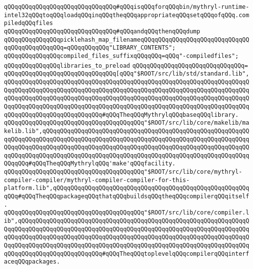 \verb|qQQqqQQqqQQqqQQqqQQqqQQqqQQqqQQq#qQQqisqQQqforqQQqbin/mythryl-runtime-intel32qQQqtoqQQqloadqQQqinqQQqtheqQQqappropriateqQQqsetqQQqofqQQq.compiledqQQqfiles|\newline
\verb|qQQqqQQqqQQqqQQqqQQqqQQqqQQqqQQq#qQQqandqQQqthenqQQqdump|\newline
\newline
\verb|qQQqqQQqqQQqqQQqpicklehash_map_filenameqQQqqQQqqQQqqQQqqQQqqQQqqQQqqQQqqQQqqQQqqQQqqQQq=qQQqqQQqqQQq"LIBRARY_CONTENTS";|\newline
\newline
\verb|qQQqqQQqqQQqqQQqcompiled_files_suffixqQQqqQQq=qQQq"-compiledfiles";|\newline
\newline
\verb|qQQqqQQqqQQqqQQqlibraries_to_preload|\newline
\verb|qQQqqQQqqQQqqQQqqQQqqQQqqQQqqQQq=|\newline
\verb|qQQqqQQqqQQqqQQqqQQqqQQqqQQqqQQq[qQQq"$ROOT/src/lib/std/standard.lib",qQQqqQQqqQQqqQQqqQQqqQQqqQQqqQQqqQQqqQQqqQQqqQQqqQQqqQQqqQQqqQQqqQQqqQQqqQQqqQQqqQQqqQQqqQQqqQQqqQQqqQQqqQQqqQQqqQQqqQQqqQQqqQQqqQQqqQQqqQQqqQQqqQQqqQQqqQQqqQQqqQQqqQQqqQQqqQQqqQQqqQQqqQQqqQQqqQQqqQQqqQQqqQQqqQQqqQQqqQQqqQQqqQQqqQQqqQQqqQQqqQQqqQQqqQQqqQQqqQQqqQQqqQQqqQQqqQQqqQQqqQQqqQQqqQQqqQQqqQQqqQQqqQQq#qQQqTheqQQqMythrylqQQqbaseqQQqlibrary.|\newline
\verb|qQQqqQQqqQQqqQQqqQQqqQQqqQQqqQQqqQQqqQQq"$ROOT/src/lib/core/makelib/makelib.lib",qQQqqQQqqQQqqQQqqQQqqQQqqQQqqQQqqQQqqQQqqQQqqQQqqQQqqQQqqQQqqQQqqQQqqQQqqQQqqQQqqQQqqQQqqQQqqQQqqQQqqQQqqQQqqQQqqQQqqQQqqQQqqQQqqQQqqQQqqQQqqQQqqQQqqQQqqQQqqQQqqQQqqQQqqQQqqQQqqQQqqQQqqQQqqQQqqQQqqQQqqQQqqQQqqQQqqQQqqQQqqQQqqQQqqQQqqQQqqQQqqQQqqQQqqQQqqQQqqQQqqQQqqQQqqQQqqQQq#qQQqTheqQQqMythrylqQQq'make'qQQqfacility.|\newline
\verb|qQQqqQQqqQQqqQQqqQQqqQQqqQQqqQQqqQQqqQQq"$ROOT/src/lib/core/mythryl-compiler-compiler/mythryl-compiler-compiler-for-this-platform.lib",qQQqqQQqqQQqqQQqqQQqqQQqqQQqqQQqqQQqqQQqqQQqqQQqqQQqqQQqqQQq#qQQqTheqQQqpackageqQQqthatqQQqbuildsqQQqtheqQQqcompilerqQQqitself.|\newline
\verb|qQQqqQQqqQQqqQQqqQQqqQQqqQQqqQQqqQQqqQQq"$ROOT/src/lib/core/compiler.lib",qQQqqQQqqQQqqQQqqQQqqQQqqQQqqQQqqQQqqQQqqQQqqQQqqQQqqQQqqQQqqQQqqQQqqQQqqQQqqQQqqQQqqQQqqQQqqQQqqQQqqQQqqQQqqQQqqQQqqQQqqQQqqQQqqQQqqQQqqQQqqQQqqQQqqQQqqQQqqQQqqQQqqQQqqQQqqQQqqQQqqQQqqQQqqQQqqQQqqQQqqQQqqQQqqQQqqQQqqQQqqQQqqQQqqQQqqQQqqQQqqQQqqQQqqQQqqQQqqQQqqQQqqQQqqQQqqQQqqQQqqQQqqQQqqQQqqQQqqQQqqQQq#qQQqTheqQQqtoplevelqQQqcompilerqQQqinterfaceqQQqpackages.|\newline
